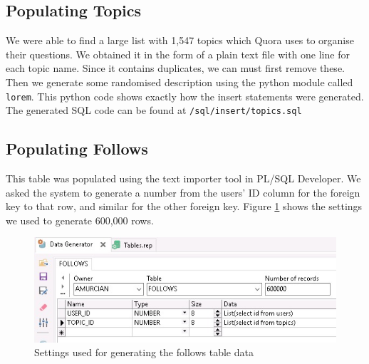 \subsection{Populating Topics}

We were able to find a large list with 1,547 topics which Quora uses to organise their questions. We obtained it in the form of a plain text file with one line for each topic name. Since it contains duplicates, we can must first remove these. Then we generate some randomised description using the python module called \verb`lorem`. This python code shows exactly how the insert statements were generated. The generated SQL code can be found at \verb`/sql/insert/topics.sql`


\subsection{Populating Follows}

This table was populated using the text importer tool in PL/SQL Developer. We asked the system to generate a number from the users' ID column for the foreign key to that row, and similar for the other foreign key. Figure \ref{follows-generator} shows the settings we used to generate 600,000 rows.

\begin{figure}[hbp]
	\centering
	\includegraphics[width=\linewidth]{images/follows_generator.jpeg}
	\caption{Settings used for generating the follows table data}
	\label{follows-generator}
\end{figure}